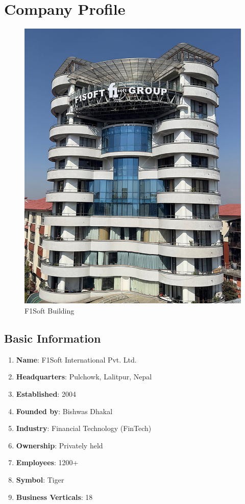 \documentclass[12pt, a4paper]{report}
\begin{document}
\chapter{Company Profile}
\begin{figure}[h]
\centering
\includegraphics[scale=0.5]{images/Company-Building.jpg}
\caption{F1Soft Building}
\end{figure}
\section{Basic Information}
\begin{enumerate} 
    \item \textbf{Name}: F1Soft International Pvt. Ltd.
    \item \textbf{Headquarters}: Pulchowk, Lalitpur, Nepal
    \item \textbf{Established}: 2004
    \item \textbf{Founded by}: Bishwas Dhakal
    \item \textbf{Industry}: Financial Technology (FinTech)
    \item \textbf{Ownership}: Privately held
    \item \textbf{Employees}: 1200+
    \item \textbf{Symbol}: Tiger
    \item \textbf{Business Verticals}: 18
\end{enumerate}
\vspace{18pt}
\end{document}
